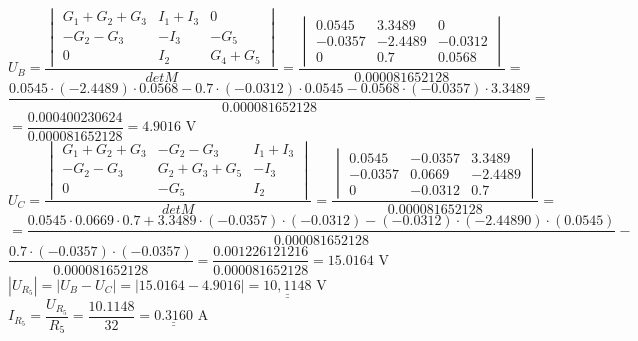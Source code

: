 \documentclass[10pt,a4paper]{article}
\def\doubleunderline#1{\underline{\underline{#1}}}
\begin{document}
\begin{center}
   \begin{large}
   $U_B=\dfrac{\begin{vmatrix} G_1+G_2 + G_3 & I_1 +I_3 &0 \\-G_2 -G_3 & -I_3 & -G_5 \\0 & I_2 & G_4 + G_5 \end{vmatrix}}{det M} =\dfrac{\begin{vmatrix} 0.0545 & 3.3489 &0 \\-0.0357 & -2.4489 & -0.0312 \\0 & 0.7 &0.0568 \end{vmatrix}}{0.000081652128} = $
   \\[6pt]
   $\dfrac{0.0545 \cdot (-2.4489)\cdot0.0568- 0.7\cdot (-0.0312) \cdot 0.0545 -0.0568 \cdot (-0.0357)\cdot 3.3489}{0.000081652128} = $
   \\[10pt] 
   $ =\dfrac{0.000400230624}{0.000081652128} =4.9016$ V
   \\[20pt]
   $U_C=\dfrac{\begin{vmatrix} G_1+G_2 + G_3 & -G_2 -G_3 &I_1 +I_3 \\-G_2 -G_3 & G_2+ G_3+ G_5 & -I_3  \\0 &-G_5 & I_2  \end{vmatrix}}{det M} =\dfrac{\begin{vmatrix} 0.0545 & -0.0357 &3.3489 \\-0.0357 & 0.0669 &  -2.4489 \\0 & -0.0312 &0.7 \end{vmatrix}}{0.000081652128} = $
   \\[10pt]
   $=\dfrac {0.0545 \cdot 0.0669 \cdot 0.7 + 3.3489 \cdot (-0.0357) \cdot (-0.0312)-(-0.0312) \cdot (-2.44890) \cdot (0.0545)}{0.000081652128} -  $   
   \\[10pt]
   $\dfrac{ 0.7 \cdot (-0.0357)\cdot(-0.0357)}{0.000081652128} = \dfrac{0.001226121216}{0.000081652128} = 15.0164 $ V
   \\[12pt]
   $|U_{R_5}| = |U_B - U_C| = |15.0164 - 4.9016| = \doubleunderline{10,1148} $ V
   \\[8pt]
   $ I_{R_5} = \dfrac{U_{R_5}}{R_5} = \dfrac{10.1148}{32} = \doubleunderline{0.3160} $ A
   \end{large}
  \end{center}    
  \newpage
  
\end{document}

